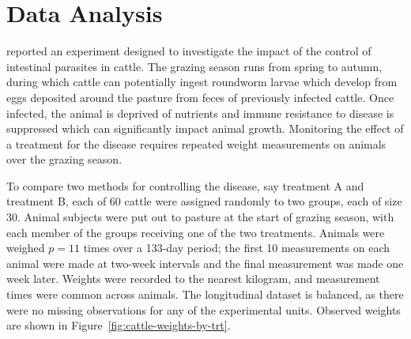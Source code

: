 
\chapter{Data Analysis} \label{data-analysis-chapter}

\cite{kenward1987method} reported an experiment designed to investigate the impact of the control of intestinal parasites in cattle. The grazing season runs from spring to autumn, during which cattle can potentially ingest roundworm larvae which develop from eggs deposited around the pasture from feces of previously infected cattle. Once infected, the animal is deprived of nutrients and immune resistance to disease is suppressed which can significantly impact animal growth. Monitoring the effect of a treatment for the disease requires repeated weight measurements on animals over the grazing season. 

\bigskip

To compare two methods for controlling the disease, say treatment A and treatment B, each of 60 cattle were assigned randomly to two groups, each of size 30. Animal subjects were put out to pasture at the start of grazing season, with each member of the groups receiving one of the two treatments. Animals were weighed $p = 11$ times over a 133-day period; the first 10 measurements on each animal were made at two-week intervals and the final measurement was made one week later. Weights were recorded to the nearest kilogram, and measurement times were common across animals. The longitudinal dataset is balanced, as there were no missing observations for any of the experimental units. Observed weights are shown in Figure~\ref{fig:cattle-weights-by-trt}.

